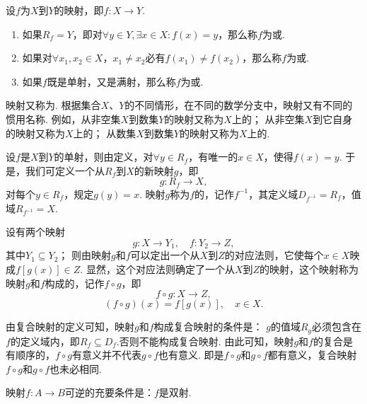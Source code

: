 \begin{definition}
设\(f\)为\(X\)到\(Y\)的映射，即\(f\colon X \to Y\).
\begin{enumerate}
\item 如果\(R_f = Y\)，即对\(\forall y \in Y, \exists x \in X: f(x) = y\)，那么称\(f\)为或.
\item 如果对\(\forall x_1, x_2 \in X\)，\(x_1 \neq x_2\)必有\(f(x_1) \neq f(x_2)\)，那么称\(f\)为或.
\item 如果\(f\)既是单射，又是满射，那么称\(f\)为或.
\end{enumerate}

映射又称为.
根据集合\(X\)、\(Y\)的不同情形，在不同的数学分支中，映射又有不同的惯用名称.
例如，从非空集\(X\)到数集\(Y\)的映射又称为\(X\)上的；
从非空集\(X\)到它自身的映射又称为\(X\)上的；
从数集\(X\)到数集\(Y\)的映射又称为\(X\)上的.
\end{definition}

\begin{definition}
设\(f\)是\(X\)到\(Y\)的单射，则由定义，对\(\forall y \in R_f\)，有唯一的\(x \in X\)，使得\(f(x) = y\).
于是，我们可定义一个从\(R_f\)到\(X\)的新映射\(g\)，即\[
g: R_f \to X,
\]对每个\(y \in R_f\)，规定\(g(y) = x\).
映射\(g\)称为\(f\)的，记作\(f^{-1}\)，其定义域\(D_{f^{-1}} = R_f\)，值域\(R_{f^{-1}} = X\).
\end{definition}

\begin{definition}
设有两个映射\[
g\colon X \to Y_1, \quad f\colon Y_2 \to Z,
\]其中\(Y_1 \subseteq Y_2\)；
则由映射\(g\)和\(f\)可以定出一个从\(X\)到\(Z\)的对应法则，它使每个\(x \in X\)映成\(f[g(x)] \in Z\).
显然，这个对应法则确定了一个从\(X\)到\(Z\)的映射，这个映射称为映射\(g\)和\(f\)构成的，记作\(f \circ g\)，即\[
f \circ g: X \to Z,
\]\[
(f \circ g)(x) = f[g(x)], \quad x \in X.
\]

由复合映射的定义可知，映射\(g\)和\(f\)构成复合映射的条件是：
\(g\)的值域\(R_g\)必须包含在\(f\)的定义域内，即\(R_f \subseteq D_f\).否则不能构成复合映射.
由此可知，映射\(g\)和\(f\)的复合是有顺序的，\(f \circ g\)有意义并不代表\(g \circ f\)也有意义.
即是\(f \circ g\)和\(g \circ f\)都有意义，复合映射\(f \circ g\)和\(g \circ f\)也未必相同.
\end{definition}

\begin{theorem}\label{theorem:集合论.映射可逆的充要条件}
映射\(f\colon A \to B\)可逆的充要条件是：\(f\)是双射.
\end{theorem}

